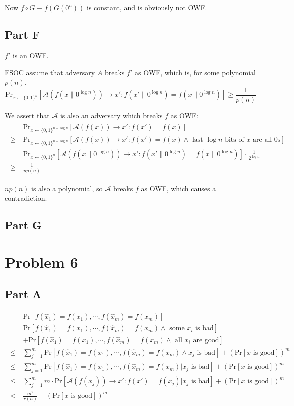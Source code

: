\documentclass[8pt]{article}
\theoremstyle{compact}
\def\le{\leqslant}
\def\ge{\geqslant}
\begin{document}
Now $f \circ G \equiv f(G(0^n))$ is constant, and is obviously not OWF. 
\subsection*{Part F}
$f'$ is an OWF.

FSOC assume that adversary $A$ breaks $f'$ as OWF, which is, for some polynomial $p(n)$, $$\text{Pr}_{x \gets \{0, 1\}^{n}}[\mathcal A(f(x \| 0^{\log n})) \to x': f(x' \| 0^{\log n}) = f(x \| 0^{\log n})] \ge \frac{1}{p(n)}$$

We assert that $\mathcal A$ is also an adversary which breaks $f$ as OWF: \begin{align*}
	\begin{split}
		&\text{Pr}_{x \gets \{0, 1\}^{n+\log n}}[\mathcal A(f(x)) \to x': f(x') = f(x)] \\\ge\ & \text{Pr}_{x \gets \{0, 1\}^{n+\log n}}[\mathcal A(f(x)) \to x': f(x') = f(x) \wedge \text{ last } \log n \text{ bits of } x \text{ are all } 0\text{s}] \\=\ & \text{Pr}_{x \gets \{0, 1\}^{n}}[\mathcal A(f(x \| 0^{\log n})) \to x': f(x' \| 0^{\log n}) = f(x \| 0^{\log n})] \cdot \frac{1}{2^{\log n}} \\\ge\ &\frac{1}{np(n)}
	\end{split}
\end{align*}

$np(n)$ is also a polynomial, so $\mathcal A$ breaks $f$ as OWF, which causes a contradiction.
\subsection*{Part G}
\section*{Problem 6}
\subsection*{Part A}
\begin{align*}
	\begin{split}
		&\text{Pr}[f(\hat x_1) = f(x_1), \cdots, f(\hat x_m) = f(x_m)] \\= \ & \text{Pr}[f(\hat x_1) = f(x_1), \cdots, f(\hat x_m) = f(x_m) \wedge \text{ some } x_i \text{ is bad}] \\&+ \text{Pr}[f(\hat x_1) = f(x_1), \cdots, f(\hat x_m) = f(x_m) \wedge \text{ all } x_i \text{ are good}] \\ \le\ & \sum_{j=1}^{m}\text{Pr}[f(\hat x_1) = f(x_1), \cdots, f(\hat x_m) = f(x_m) \wedge x_j \text{ is bad}] + \left(\text{Pr}[x \text{ is good}]\right)^m \\ \le\ & \sum_{j=1}^{m}\text{Pr}[f(\hat x_1) = f(x_1), \cdots, f(\hat x_m) = f(x_m) | x_j \text{ is bad}] + \left(\text{Pr}[x \text{ is good}]\right)^m \\ \le\ & \sum_{j=1}^{m}m \cdot \text{Pr}[\mathcal A(f(x_j)) \to x': f(x') = f(x_j) | x_j \text{ is bad}] + \left(\text{Pr}[x \text{ is good}]\right)^m \\ < \ & \frac{m^2}{r(n)} + \left(\text{Pr}[x \text{ is good}]\right)^m
	\end{split}
\end{align*}
\end{document}

